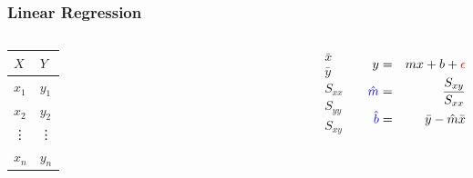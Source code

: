 \begin{frame}
  \frametitle{Linear Regression}

    \begin{columns}

      \begin{tabular}{l|l}
        $X$    & $Y$ \\ \hline
        $x_1$  & $y_1$  \\
        $x_2$  & $y_2$  \\
        \vdots & \vdots  \\
        $x_n$  & $y_n$
      \end{tabular}


      \begin{eqnarray*}
        \bar{x} \\
        \bar{y} \\
        S_{xx} \\
        S_{yy} \\
        S_{xy} 
        \end{eqnarray*}

      
      \begin{eqnarray*}
        y & = & m x + b + {\color{red}\epsilon} \\
        {\color{blue}\hat{m}} & = & \frac{S_{xy}}{S_{xx}} \\
        {\color{blue}\hat{b}} & = & \bar{y} - \hat{m} \bar{x}
      \end{eqnarray*}

    \end{columns}





\end{frame}

